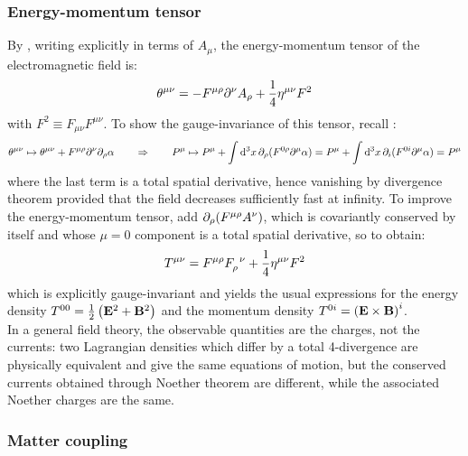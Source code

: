 \subsubsection{Energy-momentum tensor}

By , writing  explicitly in terms of $ A_\mu $, the energy-momentum tensor of the electromagnetic field is:
\begin{equation}
  \theta^{\mu \nu} = - F^{\mu \rho} \partial^\nu A_\rho + \frac{1}{4} \eta^{\mu \nu} F^2
\end{equation}
with $ F^2 \equiv F_{\mu \nu} F^{\mu \nu} $. To show the gauge-invariance of this tensor, recall :
\begin{equation*}
  \theta^{\mu \nu} \mapsto \theta^{\mu \nu} + F^{\mu \rho} \partial^\nu \partial_\rho \alpha
  \qquad \Rightarrow \qquad
  P^\mu \mapsto P^\mu + \int \mathrm{d}^3x\, \partial_\rho (F^{0 \rho} \partial^\mu \alpha) = P^\mu + \int \mathrm{d}^3x\, \partial_i (F^{0i} \partial^\mu \alpha) = P^\mu
\end{equation*}
where the last term is a total spatial derivative, hence vanishing by divergence theorem provided that the field decreases sufficiently fast at infinity. To improve the energy-momentum tensor, add $ \partial_\rho (F^{\mu \rho} A^\nu) $, which is covariantly conserved by itself and whose $ \mu = 0 $ component is a total spatial derivative, so to obtain:
\begin{equation}
  T^{\mu \nu} = F^{\mu \rho} \tensor{F}{_\rho^\nu} + \frac{1}{4} \eta^{\mu \nu} F^2
\end{equation}
which is explicitly gauge-invariant and yields the usual expressions for the energy density $ T^{00} = \frac{1}{2} \left( \mathbf{E}^2 + \mathbf{B}^2 \right) $ and the momentum density $ T^{0i} = \left( \mathbf{E} \times \mathbf{B} \right)^i $.\\
In a general field theory, the observable quantities are the charges, not the currents: two Lagrangian densities which differ by a total 4-divergence are physically equivalent and give the same equations of motion, but the conserved currents obtained through Noether theorem are different, while the associated Noether charges are the same.

\subsubsection{Matter coupling}

